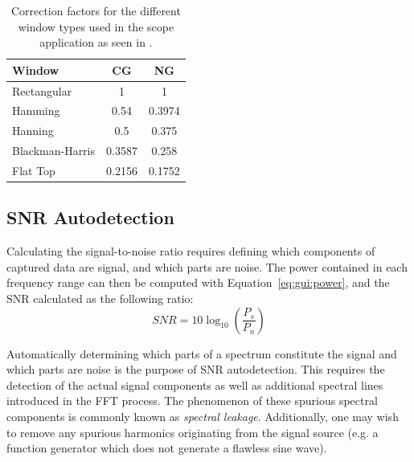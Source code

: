 \begin{table}
    \centering
    \caption[Window Correction Factors]{%
        Correction factors  for the different  window types used in  the scope
        application as seen in \cite{gui:hanspi}.%
    }
    \label{tab:gui:corrfactors}
    \begin{tabular}{lSS}
        \toprule
        Window          & {CG}   & {NG}\\
        \midrule
        Rectangular     & 1      & 1\\
        Hamming         & 0.54   & 0.3974\\
        Hanning         & 0.5    & 0.375\\
        Blackman-Harris & 0.3587 & 0.258\\
        Flat Top        & 0.2156 & 0.1752\\
        \bottomrule
    \end{tabular}
\end{table}


%
%
\subsection{SNR Autodetection} %
\label{subsec:gui:snr_autodetection}

Calculating the  signal-to-noise ratio  requires defining which  components of
captured data  are signal, and which  parts are noise. The power  contained in
each frequency  range can  then be computed  with Equation~\ref{eq:gui:power},
and the SNR calculated as the following ratio:
\begin{equation}
    SNR = 10\log_{10}(\frac{P_s}{P_n})
    \label{eq:gui:snr}
\end{equation}

Automatically determining which parts of  a spectrum constitute the signal and
which parts are  noise is the purpose of SNR  autodetection. This requires the
detection of the actual signal components as well as additional spectral lines
introduced  in the  FFT  process. The phenomenon  of  these spurious  spectral
components is commonly known as \emph{spectral leakage}. Additionally, one may
wish to remove any spurious harmonics originating from the signal source (e.g.
a function generator which does not generate a flawless sine wave).

